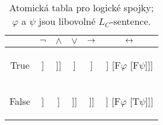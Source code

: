\begin{table}[htbp]
\centering
\begin{tabular}{@{}c||c|c|c|c|c@{}}
 & $\neg$ & $\land$ & $\lor$ & $\mathbin{\rightarrow}$ & $\mathbin{\leftrightarrow}$  \\ \midrule \midrule
True
&  
\begin{forest}
[$\mathrm{T}\neg\varphi$ [$\mathrm{F}\varphi$]]
\end{forest}
&  
\begin{forest}
[$\mathrm{T}\varphi\land\psi$ [$\mathrm{T}\varphi$ [$\mathrm{T}\psi$]]]
\end{forest}
& 
\begin{forest}
[$\mathrm{T}\varphi\lor\psi$ [$\mathrm{T}\varphi$] [$\mathrm{T}\psi$]]
\end{forest}
&
\begin{forest}
[$\mathrm{T}\varphi\limplies\psi$ [$\mathrm{F}\varphi$] [$\mathrm{T}\psi$]]
\end{forest}
&  
\begin{forest}
[$\mathrm{T}\varphi\liff\psi$ [$\mathrm{T}\varphi$ [$\mathrm{T}\psi$]] [$\mathrm{F}\varphi$ [$\mathrm{F}\psi$]]]
\end{forest}
\\ \midrule
False 
& 
\begin{forest}
[$\mathrm{F}\neg\varphi$ [$\mathrm{T}\varphi$]]
\end{forest}
&
\begin{forest}
[$\mathrm{F}\varphi\land\psi$ [$\mathrm{F}\varphi$] [$\mathrm{F}\psi$]]
\end{forest}
&
\begin{forest}
[$\mathrm{F}\varphi\lor\psi$ [$\mathrm{F}\varphi$ [$\mathrm{F}\psi$]]]
\end{forest}
&
\begin{forest}
[$\mathrm{F}\varphi\limplies\psi$ [$\mathrm{T}\varphi$ [$\mathrm{F}\psi$]]]
\end{forest}
&
\begin{forest}
[$\mathrm{F}\varphi\liff\psi$ [$\mathrm{T}\varphi$ [$\mathrm{F}\psi$]] [$\mathrm{F}\varphi$ [$\mathrm{T}\psi$]]]
\end{forest}
\end{tabular}
\caption{Atomická tabla pro logické spojky; $\varphi$ a $\psi$ jsou libovolné $L_C$-sentence.}
\label{table:predicate-atomic-tableaux-logical}
\end{table}


